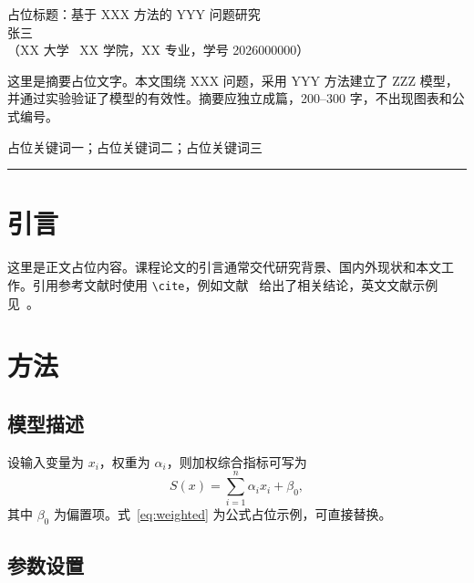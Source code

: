 \documentclass[UTF8,a4paper,zihao=-4,fontset=\swfontset]{ctexart}
\begin{document}
\begin{center}
  {\heiti 占位标题：基于 XXX 方法的 YYY 问题研究}\\[0.8em]
  { 张\quad 三}\\[0.4em]
  {（XX 大学 \ XX 学院，XX 专业，学号 2026000000）}
\end{center}

\vspace{0.5em}

这里是摘要占位文字。本文围绕 XXX 问题，采用 YYY 方法建立了 ZZZ 模型，并通过实验验证了模型的有效性。摘要应独立成篇，200--300 字，不出现图表和公式编号。

\vspace{0.3em}
占位关键词一；占位关键词二；占位关键词三

\vspace{0.6em}
\hrule
\vspace{0.8em}

\section{引言}

这里是正文占位内容。课程论文的引言通常交代研究背景、国内外现状和本文工作。引用参考文献时使用 \verb|\cite|，例如文献~\cite{zhang2024demo} 给出了相关结论，英文文献示例见~\cite{smith2023demo}。

\section{方法}

\subsection{模型描述}

设输入变量为 $x_i$，权重为 $\alpha_i$，则加权综合指标可写为
\begin{equation}
  S(x)=\sum_{i=1}^{n}\alpha_i x_i+\beta_0,
  \label{eq:weighted}
\end{equation}
其中 $\beta_0$ 为偏置项。式~\eqref{eq:weighted} 为公式占位示例，可直接替换。

\subsection{参数设置}
\end{document}
